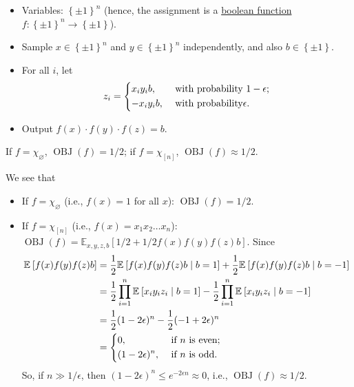 \begin{itemize}
	\item Variables: \(\left\{ \pm 1 \right\} ^n\) (hence, the assignment is a \hyperref[def:boolean-function]{boolean function} \(f\colon \left\{ \pm 1 \right\} ^n \to  \left\{ \pm 1 \right\} \)).
	\item Sample \(x\in \left\{ \pm 1 \right\} ^n\) and \(y\in \left\{ \pm 1 \right\} ^n\) independently, and also \(b\in \left\{ \pm 1 \right\} \).
	\item For all \(i\), let
	      \[
		      z_i = \begin{dcases}
			      x_i y_i b,  & \text{ with probability } 1-\epsilon  ; \\
			      -x_i y_i b, & \text{ with probability} \epsilon  .
		      \end{dcases}
	      \]
	\item Output \(f(x) \cdot f(y)\cdot f(z) = b\).
\end{itemize}

\begin{remark}
	If \(f = \chi _\varnothing \), \(\mathop{\mathrm{OBJ}}(f) = 1/2\); if \(f = \chi _{[n]}\), \(\mathop{\mathrm{OBJ}}(f) \approx 1 / 2\).
\end{remark}
\begin{explanation}
	We see that
	\begin{itemize}
		\item If \(f = \chi _\varnothing \) (i.e., \(f(x) = 1\) for all \(x\)): \(\mathop{\mathrm{OBJ}}(f) = 1 / 2\).
		\item If \(f = \chi _{[n]}\) (i.e., \(f(x) = x_1 x_2 \ldots  x_n\)): \(\mathop{\mathrm{OBJ}}(f) = \mathbb{E}_{x, y, z, b}\left[1 / 2 + 1 / 2 f(x)f(y)f(z)b \right] \). Since
		      \[
			      \begin{split}
				      \mathbb{E}_{}\left[f(x) f(y) f(z) b \right]
				      &= \frac{1}{2} \mathbb{E}_{}\left[f(x) f(y) f(z) b \mid b = 1 \right] + \frac{1}{2} \mathbb{E}_{}\left[f(x) f(y) f(z) b \mid b = -1 \right] \\
				      &= \frac{1}{2} \prod_{i=1}^{n} \mathbb{E}_{}\left[x_i y_i z_i \mid b = 1 \right] - \frac{1}{2} \prod_{i=1}^{n} \mathbb{E}_{}\left[x_i y_i z_i \mid b = -1 \right] \\
				      &= \frac{1}{2} (1 - 2 \epsilon )^n - \frac{1}{2} (-1 + 2\epsilon )^n\\
				      &= \begin{dcases}
					      0,                & \text{ if \(n\) is even}  ; \\
					      (1-2\epsilon )^n, & \text{ if \(n\) is odd}.
				      \end{dcases}
			      \end{split}
		      \]
		      So, if \(n \gg 1 / \epsilon \), then \((1 - 2 \epsilon )^n \leq e^{-2 \epsilon n} \approx 0\), i.e., \(\mathop{\mathrm{OBJ}}(f) \approx 1 / 2\).
	\end{itemize}
\end{explanation}

